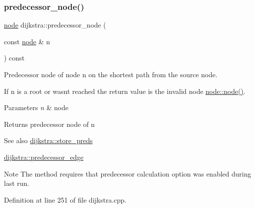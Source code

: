 \subsubsection{\texorpdfstring{predecessor\+\_\+node()}{predecessor\_node()}}
{\footnotesize\ttfamily \mbox{\hyperlink{classnode}{node}} dijkstra\+::predecessor\+\_\+node (\begin{DoxyParamCaption}\item[{const \mbox{\hyperlink{classnode}{node}} \&}]{n }\end{DoxyParamCaption}) const}



Predecessor node of node {\ttfamily n} on the shortest path from the source node. 

If {\ttfamily n} is a root or wasn\textquotesingle{}t reached the return value is the invalid node \mbox{\hyperlink{classnode_a6da4ea35f222059db9a59cf40be459f9}{node\+::node()}}.


\begin{DoxyParams}{Parameters}
{\em n} & node\\
\hline
\end{DoxyParams}
\begin{DoxyReturn}{Returns}
predecessor node of {\ttfamily n} 
\end{DoxyReturn}
\begin{DoxySeeAlso}{See also}
\mbox{\hyperlink{classdijkstra_af79383dbbb6b737afcefd8e32350192d}{dijkstra\+::store\+\_\+preds}} 

\mbox{\hyperlink{classdijkstra_aa3ef1a7d7dfc33e4a39aff309f873929}{dijkstra\+::predecessor\+\_\+edge}}
\end{DoxySeeAlso}
\begin{DoxyNote}{Note}
The method requires that predecessor calculation option was enabled during last run. 
\end{DoxyNote}


Definition at line 251 of file dijkstra.\+cpp.


